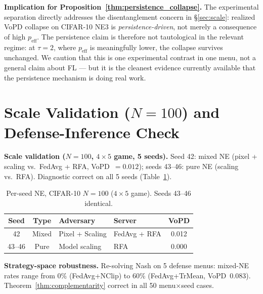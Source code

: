 \documentclass{article}
\begin{document}
\textbf{Implication for Proposition~\ref{thm:persistence_collapse}.} The experimental separation directly addresses the disentanglement concern in §\ref{sec:scale}: realized VoPD collapse on CIFAR-10 NE3 is \emph{persistence-driven}, not merely a consequence of high $p_{\mathrm{eff}}$. The persistence claim is therefore not tautological in the relevant regime: at $\tau{=}2$, where $p_{\mathrm{eff}}$ is meaningfully lower, the collapse survives unchanged. We caution that this is one experimental contrast in one menu, not a general claim about FL — but it is the cleanest evidence currently available that the persistence mechanism is doing real work.

\section{Scale Validation ($N=100$) and Defense-Inference Check}
\label{app:scale}
\label{app:inference}

\textbf{Scale validation ($N=100$, $4{\times}5$ game, 5 seeds).} Seed 42: mixed NE (pixel + scaling vs.\ FedAvg + RFA, VoPD~$= 0.012$); seeds 43--46: pure NE (scaling vs.\ RFA). Diagnostic correct on all 5 seeds (Table~\ref{tab:scale100}).

\begin{table}[h]
\caption{Per-seed NE, CIFAR-10 $N=100$ ($4{\times}5$ game). Seeds 43--46 identical.}
\label{tab:scale100}
\centering\small
\begin{tabular}{c|c|l|l|c}
\toprule
Seed & Type & Adversary & Server & VoPD \\
\midrule
42      & Mixed & Pixel + Scaling & FedAvg + RFA & 0.012 \\
43--46  & Pure  & Model scaling   & RFA          & 0.000 \\
\bottomrule
\end{tabular}
\end{table}

\textbf{Strategy-space robustness.}\label{app:strategy} Re-solving Nash on 5 defense menus: mixed-NE rates range from 0\% (FedAvg+NClip) to 60\% (FedAvg+TrMean, VoPD~$0.083$). Theorem~\ref{thm:complementarity} correct in all 50 menu$\times$seed cases.
\end{document}
